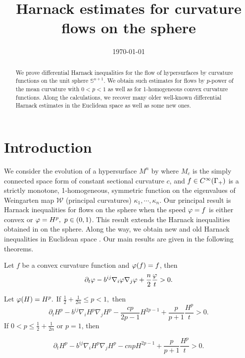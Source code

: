 \documentclass{amsart}
\begin{document}
\title[Harnack inequalities in the sphere]{Harnack estimates for curvature flows on the sphere}





\curraddr{}
\email{}
\date{\today}

\dedicatory{}
\subjclass[2010]{}
\keywords{}


\begin{abstract}
We prove differential Harnack inequalities for the flow of hypersurfaces by curvature functions on the unit sphere $\mathbb{S}^{n+1}.$ We obtain such estimates for flows by $p$-power of the mean curvature with $0<p<1$ as well as for 1-homogeneous convex curvature functions. Along the calculations, we recover many older well-known differential Harnack estimates in the Euclidean space as well as some new ones.
\end{abstract}

\maketitle


\section{Introduction}

We consider the evolution of a hypersurface $M^n$ by
\eq{\label{eq:CurvFlow}
\partial_tx=-\varphi(f)\nu,~ x:M^n\times[0,T)\to M_c,
}
where \(M_c\) is the simply connected space form of constant sectional curvature \(c\), and $f\in C^{\infty}(\Gamma_+)$ is a strictly monotone, 1-homogeneous, symmetric function on the eigenvalues of Weingarten map \(\mathcal{W}\) (principal curvatures) \(\kappa_1, \cdots, \kappa_n\).
 Our principal result is Harnack inequalities for flows on the sphere when the speed $\varphi=f$ is either convex or $\varphi=H^{p},~ p\in (0,1)$. This result extends the Harnack inequalities obtained in \cite{2015arXiv150802821B, bryanlouie} on the sphere. Along the way, we obtain new and old Harnack inequalities in Euclidean space \cite{MR1296393, MR1100812, MR1316556, MR2813400, MR1480081}. Our main results are given in the following theorems.
 \begin{theorem}\label{thm: main A}
Let $f$ be a  convex curvature function and $\varphi(f)=f$, then
$$\partial_t \varphi-b^{ij}\nabla_i\varphi\nabla_j\varphi+\frac{n}{2}\frac{\varphi}{t}>0.$$
\end{theorem}

\begin{theorem}\label{thm: main 1}
Let $\varphi(H)=H^{p}.$ If $\frac{1}{2}+\frac{1}{2n}\leq {p}< 1,$ then
\[
\partial_t H^{p} - b^{ij}\nabla_iH^{p}\nabla_jH^{p} - \frac{c {p}}{2{p}-1}H^{2{p}-1} + \frac{{p}}{{p}+1} \frac{H^{p}}{t} > 0.
\]
If $0<{p}\leq \frac{1}{2} + \frac{1}{2n}$ or $p=1$, then

\[
\partial_t H^{p} - b^{ij}\nabla_iH^{p}\nabla_jH^{p} - c n{p}H^{2{p}-1} + \frac{{p}}{{p}+1} \frac{H^{p}}{t} > 0.
\]
\end{theorem}
\end{document}
